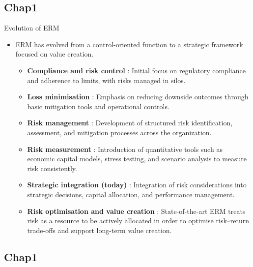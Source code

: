 \documentclass[aspectratio=169, 10pt]{beamer} %
\begin{document}
\subsection{Chap1}
\begin{frame}{Evolution of ERM}
    \begin{itemize}

\item[$\bullet$]  ERM has evolved from a control-oriented function
to a strategic framework focused on value creation.

\medskip

\begin{itemize}
    \item[$\bullet$] \textbf{Compliance and risk control} :
    Initial focus on regulatory compliance and adherence to limits, with risks
    managed in silos.

    \item [$\bullet$]\textbf{Loss minimisation} :
    Emphasis on reducing downside outcomes through basic mitigation tools and
    operational controls.

    \item[$\bullet$] \textbf{Risk management} :
    Development of structured risk identification, assessment, and mitigation
    processes across the organization.

    \item[$\bullet$] \textbf{Risk measurement} :
    Introduction of quantitative tools such as economic capital models, stress
    testing, and scenario analysis to measure risk consistently.

    \item [$\bullet$]\textbf{Strategic integration (today)} :
    Integration of risk considerations into strategic decisions, capital
    allocation, and performance management.

    \item[$\bullet$] \textbf{Risk optimisation and value creation} :
    State-of-the-art ERM treats risk as a resource to be actively allocated in
    order to optimise risk--return trade-offs and support long-term value
    creation.
\end{itemize}
\end{itemize}
\end{frame}

\subsection{Chap1}
\end{document}
